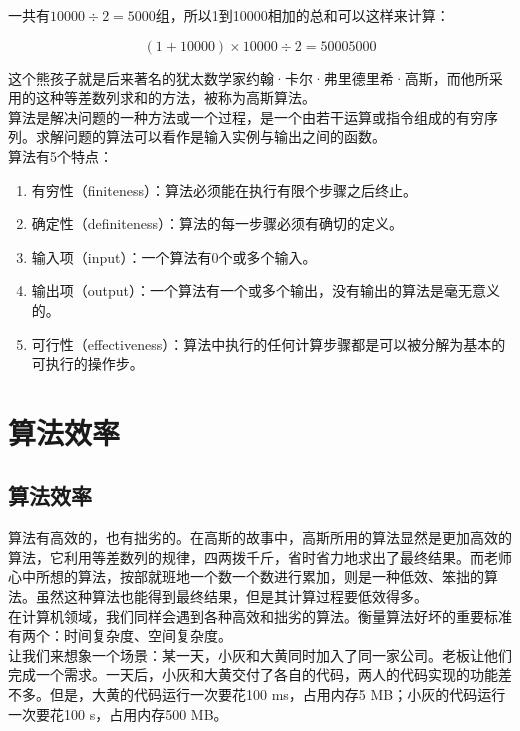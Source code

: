 一共有$ 10000 \div 2 = 5000 $组，所以1到10000相加的总和可以这样来计算：

$$
	(1 + 10000) \times 10000 \div 2 = 50005000
$$

这个熊孩子就是后来著名的犹太数学家约翰·卡尔·弗里德里希·高斯，而他所采用的这种等差数列求和的方法，被称为高斯算法。\\

算法是解决问题的一种方法或一个过程，是一个由若干运算或指令组成的有穷序列。求解问题的算法可以看作是输入实例与输出之间的函数。\\

算法有5个特点：

\begin{enumerate}
	\item 有穷性（finiteness）：算法必须能在执行有限个步骤之后终止。
	\item 确定性（definiteness）：算法的每一步骤必须有确切的定义。
	\item 输入项（input）：一个算法有0个或多个输入。
	\item 输出项（output）：一个算法有一个或多个输出，没有输出的算法是毫无意义的。
	\item 可行性（effectiveness）：算法中执行的任何计算步骤都是可以被分解为基本的可执行的操作步。
\end{enumerate}

\newpage

\section{算法效率}

\subsection{算法效率}

算法有高效的，也有拙劣的。在高斯的故事中，高斯所用的算法显然是更加高效的算法，它利用等差数列的规律，四两拨千斤，省时省力地求出了最终结果。而老师心中所想的算法，按部就班地一个数一个数进行累加，则是一种低效、笨拙的算法。虽然这种算法也能得到最终结果，但是其计算过程要低效得多。\\

在计算机领域，我们同样会遇到各种高效和拙劣的算法。衡量算法好坏的重要标准有两个：时间复杂度、空间复杂度。\\

让我们来想象一个场景：某一天，小灰和大黄同时加入了同一家公司。老板让他们完成一个需求。一天后，小灰和大黄交付了各自的代码，两人的代码实现的功能差不多。但是，大黄的代码运行一次要花100 ms，占用内存5 MB；小灰的代码运行一次要花100 s，占用内存500 MB。\\

